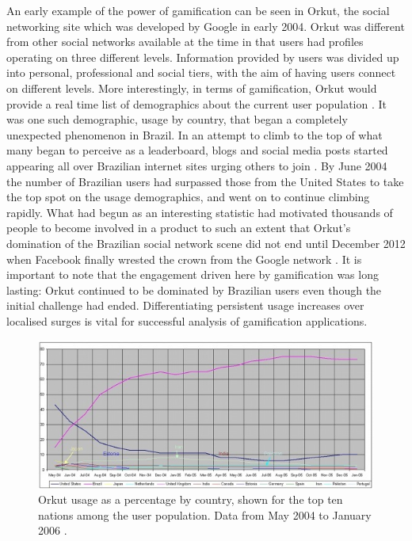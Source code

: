 \documentclass[12pt,a4paper,twoside]{report}
\begin{document}
An early example of the power of gamification can be seen in Orkut, the social networking site which was developed by Google in early 2004. Orkut was different from other social networks available at the time in that users had profiles operating on three different levels. Information provided by users was divided up into personal, professional and social tiers, with the aim of having users connect on different levels. More interestingly, in terms of gamification, Orkut would provide a real time list of demographics about the current user population \cite{fragoso2006wtf}. It was one such demographic, usage by country, that began a completely unexpected phenomenon in Brazil. In an attempt to climb to the top of what many began to perceive as a leaderboard, blogs and social media posts started appearing all over Brazilian internet sites urging others to join \cite{zichermann2010game}. By June 2004 the number of Brazilian users had surpassed those from the United States to take the top spot on the usage demographics, and went on to continue climbing rapidly. What had begun as an interesting statistic had motivated thousands of people to become involved in a product to such an extent that Orkut's domination of the Brazilian social network scene did not end until December 2012 when Facebook finally wrested the crown from the Google network \cite{1_comscore_2012}. It is important to note that the engagement driven here by gamification was long lasting: Orkut continued to be dominated by Brazilian users even though the initial challenge had ended. Differentiating persistent usage increases over localised surges is vital for successful analysis of gamification applications.

\begin{figure}
\begin{center}
	\includegraphics{../img/orkut-brazil.jpg}
	\caption{Orkut usage as a percentage by country, shown for the top ten nations among the user population. Data from May 2004 to January 2006 \cite{fragoso2006wtf}.}
	\label{orkut-brazil}
\end{center}
\end{figure}
\end{document}
